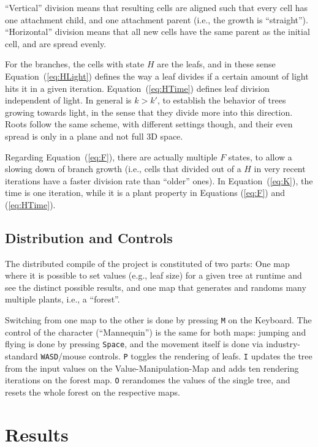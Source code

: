 \documentclass[11pt, abstract=on]{scrartcl}
\begin{document}
``Vertical'' division means that resulting cells are aligned such that every cell has one attachment child, and one attachment parent (i.e., the growth is ``straight''). ``Horizontal'' division means that all new cells have the same parent as the initial cell, and are spread evenly.

For the branches, the cells with state $H$ are the leafs, and in these sense Equation~(\ref{eq:HLight}) defines the way a leaf divides if a certain amount of light hits it in a given iteration. Equation~(\ref{eq:HTime}) defines leaf division independent of light. In general is $k > k'$, to establish the behavior of trees growing towards light, in the sense that they divide more into this direction. Roots follow the same scheme, with different settings though, and their even spread is only in a plane and not full 3D space.

Regarding Equation~(\ref{eq:F}), there are actually multiple $F$ states, to allow a slowing down of branch growth (i.e., cells that divided out of a $H$ in very recent iterations have a faster division rate than ``older'' ones). In Equation~(\ref{eq:K}), the time is one iteration, while it is a plant property in Equations (\ref{eq:F}) and (\ref{eq:HTime}).

\subsection{Distribution and Controls}
The distributed compile of the project is constituted of two parts: One map where it is possible to set values (e.g., leaf size) for a given tree at runtime and see the distinct possible results, and one map that generates and randoms many multiple plants, i.e., a ``forest''.

Switching from one map to the other is done by pressing \texttt{M} on the Keyboard. The control of the character (``Mannequin'') is the same for both maps: jumping and flying is done by pressing \texttt{Space}, and the movement itself is done via industry-standard \texttt{WASD}/mouse controls. \texttt{P} toggles the rendering of leafs. \texttt{I} updates the tree from the input values on the Value-Manipulation-Map and adds ten rendering iterations on the forest map. \texttt{O} rerandomes the values of the single tree, and resets the whole forest on the respective maps.


\section{Results}
\end{document}
